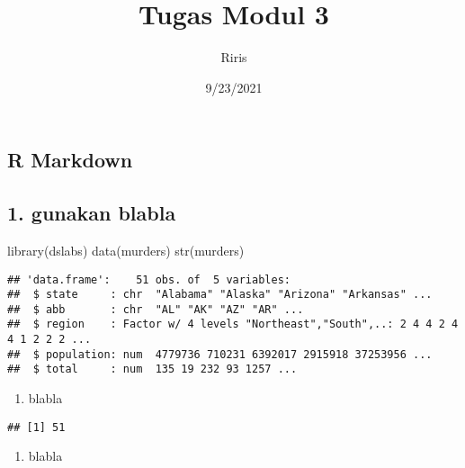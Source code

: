 \documentclass[
]{article}
\title{Tugas Modul 3}
\author{Riris}
\date{9/23/2021}
\newenvironment{Shaded}{\begin{snugshade}}{\end{snugshade}}
\newcommand{\FunctionTok}[1]{\textcolor[rgb]{0.00,0.00,0.00}{#1}}
\newcommand{\NormalTok}[1]{#1}
\newcommand{\SpecialCharTok}[1]{\textcolor[rgb]{0.00,0.00,0.00}{#1}}
\providecommand{\tightlist}{%
  \setlength{\itemsep}{0pt}\setlength{\parskip}{0pt}}
\begin{document}
\maketitle

\hypertarget{r-markdown}{%
\subsection{R Markdown}\label{r-markdown}}

\hypertarget{gunakan-blabla}{%
\subsection{1. gunakan blabla}\label{gunakan-blabla}}

\begin{Shaded}
\begin{Highlighting}[]
\FunctionTok{library}\NormalTok{(dslabs)}
\FunctionTok{data}\NormalTok{(murders)}
\FunctionTok{str}\NormalTok{(murders)}
\end{Highlighting}
\end{Shaded}

\begin{verbatim}
## 'data.frame':    51 obs. of  5 variables:
##  $ state     : chr  "Alabama" "Alaska" "Arizona" "Arkansas" ...
##  $ abb       : chr  "AL" "AK" "AZ" "AR" ...
##  $ region    : Factor w/ 4 levels "Northeast","South",..: 2 4 4 2 4 4 1 2 2 2 ...
##  $ population: num  4779736 710231 6392017 2915918 37253956 ...
##  $ total     : num  135 19 232 93 1257 ...
\end{verbatim}

\begin{enumerate}
\def\labelenumi{\alph{enumi}.}
\tightlist
\item
  blabla
\end{enumerate}

\begin{Shaded}
\end{Shaded}

\begin{verbatim}
## [1] 51
\end{verbatim}

\begin{enumerate}
\def\labelenumi{\alph{enumi}.}
\setcounter{enumi}{1}
\tightlist
\item
  blabla
\end{enumerate}
\end{document}
